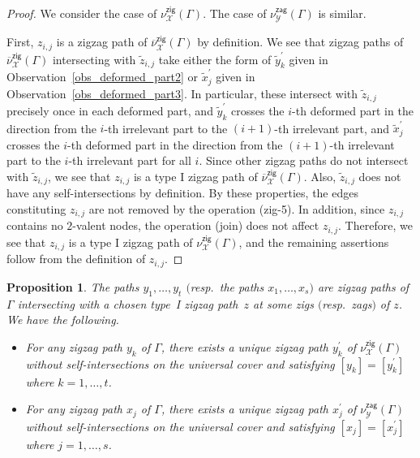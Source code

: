 \documentclass[pdftex]{sigma}%
\numberwithin{equation}{section}
\numberwithin{figure}{section}
\numberwithin{table}{section}
\newtheorem{Proposition}[Theorem]{Proposition}
 { \theoremstyle{definition}
\newtheorem{Definition}[Theorem]{Definition}
\newtheorem{Note}[Theorem]{Note}
\newtheorem{Example}[Theorem]{Example}
\newtheorem{Remark}[Theorem]{Remark}
\newtheorem{observation}[Theorem]{Observation}
\newtheorem{operation}[Theorem]{Operation}
\newtheorem{setting}[Theorem]{Setting}}
\newcommand{\calX}{\mathcal{X}}
\newcommand{\calY}{\mathcal{Y}}
\newcommand{\zig}{\mathsf{zig}}
\newcommand{\zag}{\mathsf{zag}}
\begin{document}
\begin{proof}
We consider the case of $\nu^\zig_\calX(\Gamma)$. The case of $\nu^\zag_\calY(\Gamma)$ is similar.

First, $z_{i,j}$ is a zigzag path of $\overline{\nu}^\zig_\calX(\Gamma)$ by definition.
We see that zigzag paths of $\overline{\nu}^\zig_\calX(\Gamma)$ intersecting with $\widetilde{z}_{i,j}$ take either the form of $\widetilde{y}_k^\prime$ given in Observation~\ref{obs_deformed_part2} or $\widetilde{x}_j^\prime$ given in Observation~\ref{obs_deformed_part3}.
In particular, these intersect with $\widetilde{z}_{i,j}$ precisely once in each deformed part, and
$\widetilde{y}_k^\prime$ crosses the $i$-th deformed part in the direction from the $i$-th irrelevant part to the $(i+1)$-th irrelevant part, and $\widetilde{x}_j^\prime$ crosses the $i$-th deformed part in the direction from the $(i+1)$-th irrelevant part to the $i$-th irrelevant part for all $i$.
Since other zigzag paths do not intersect with $\widetilde{z}_{i,j}$, we see that $z_{i,j}$ is a type I zigzag path of $\overline{\nu}^\zig_\calX(\Gamma)$.
Also, $\widetilde{z}_{i,j}$ does not have any self-intersections by definition.
By these properties, the edges constituting $z_{i,j}$ are not removed by the operation (zig-5).
In addition, since $z_{i,j}$ contains no $2$-valent nodes, the operation (join) does not affect $z_{i,j}$.
Therefore, we see that $z_{i,j}$ is a type I zigzag path of $\nu^\zig_\calX(\Gamma)$, and the remaining assertions follow from the definition of $z_{i,j}$.
\end{proof}

\begin{Proposition}\label{zigzag_afterdeform1}
The paths $y_1,\dots, y_t$ $($resp.\ the paths $x_1,\dots, x_s)$ are zigzag paths of $\Gamma$ intersecting with a chosen type~I zigzag path~$z$
at some zigs $($resp.\ zags$)$ of $z$. We have the following.
\begin{itemize}\itemsep=0pt
\item[\rm (1)] For any zigzag path $y_k$ of $\Gamma$, there exists a unique zigzag path $y_k^\prime$ of $\nu^\zig_\calX(\Gamma)$ without self-intersections
on the universal cover and satisfying $[y_k]=[y_k^\prime]$ where $k=1,\dots,t$.
\item[\rm (2)] For any zigzag path $x_j$ of $\Gamma$, there exists a unique zigzag path $x_j^\prime$ of $\nu^\zag_\calY(\Gamma)$ without self-intersections
on the universal cover and satisfying $[x_j]=[x_j^\prime]$ where $j=1,\dots,s$.
\end{itemize}
\end{Proposition}
\end{document}
